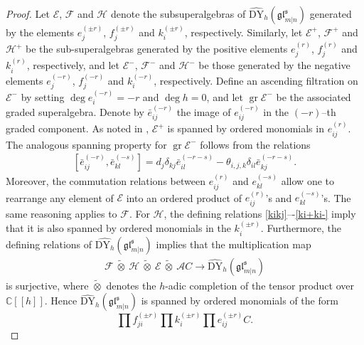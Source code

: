 \documentclass[a4paper,12pt]{article}
\numberwithin{equation}{section}
\begin{document}
\begin{proof}
Let $\mathcal{E}$, $\mathcal{F}$ and $\mathcal{H}$ denote the subsuperalgebras of $\widehat{\mathrm{DY}}_{h}(\mathfrak{gl}^{\mathfrak{s}}_{m|n})$ generated by the elements $e_{j}^{(\pm r)}$, $f_{j}^{(\pm r)}$ and $k_{i}^{(\pm r)}$, respectively. Similarly, let $\mathcal{E}^{+}$, $\mathcal{F}^{+}$ and $\mathcal{H}^{+}$ be the sub-superalgebras generated by the positive elements $e_{j}^{(r)}$, $f_{j}^{(r)}$ and $k_{i}^{(r)}$, respectively, and let $\mathcal{E}^{-}$, $\mathcal{F}^{-}$ and $\mathcal{H}^{-}$ be those generated by the negative elements $e_{j}^{(-r)}$, $f_{j}^{(-r)}$ and $k_{i}^{(-r)}$, respectively. Define an ascending filtration on $\mathcal{E}^{-}$ by setting $\deg 
e_{i}^{(-r)}=-r$ and $\deg h=0$, and let $\operatorname{gr} \mathcal{E}^{-}$ be the associated graded superalgebra. Denote by $\bar{e}_{ij}^{(-r)}$ the image of $e_{ij}^{(-r)}$ in the $(-r)$--th graded component. As noted in \cite{G07}, $\mathcal{E}^{+}$ is spanned by ordered monomials in $e_{ij}^{(r)}$. The analogous spanning property for $\operatorname{gr} \mathcal{E}^{-}$ follows from the relations
\begin{align*}
\left[\bar{e}_{ij}^{(-r)},\bar{e}_{kl}^{(-s)}\right]=d_{j}\delta_{kj}
\bar{e}_{il}^{(-r-s)}-\theta_{i,j,k}\delta_{il}\bar{e}_{kj}^{(-r-s)}.
\end{align*}
Moreover, the commutation relations between $e_{ij}^{(r)}$ and $e_{kl}^{(-s)}$ allow one to rearrange any element of $\mathcal{E}$ into an ordered product of $e_{ij}^{(r)}$'s and $e_{kl}^{(-s)}$'s. The same reasoning applies to $\mathcal{F}$.  For $\mathcal{H}$, the defining relations \eqref{kikj}–-\eqref{ki+ki-} imply that it is also spanned by ordered monomials in the $k_{i}^{(\pm r)}$. Furthermore, the defining relations of $\widehat{\mathrm{DY}_{h}}(\mathfrak{gl}^{\mathfrak{s}}_{m|n})$ implies that the multiplication map
\begin{align*}
\mathcal{F}~\widetilde{\otimes}~\mathcal{H}~\widetilde{\otimes}~
\mathcal{E}~\widetilde{\otimes}~\mathcal{A}C\rightarrow \widehat{\mathrm{DY}}_{h}(\mathfrak{gl}^{\mathfrak{s}}_{m|n})
\end{align*}
is surjective, where $\widetilde{\otimes}$ denotes the $h$-adic completion of the tensor product over $\mathbb{C}[[h]]$. Hence $\widehat{\mathrm{DY}}_{h}(\mathfrak{gl}^{\mathfrak{s}}_{m|n})$ is spanned by ordered monomials of the form
$$
\prod f_{ji}^{(\pm r)} \prod k_{i}^{(\pm r)}\prod e_{ij}^{(\pm r)} C.
$$


\end{proof}
\end{document}
